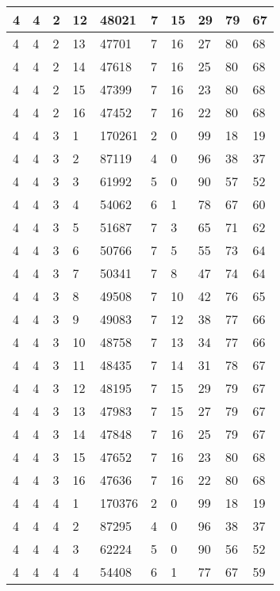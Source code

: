 \begin{table}[!ht]
\begin{tabular}{|l|l|l|l|l|l|l|l|l|l|}
        4 & 4 & 2 & 12 & 48021 & 7 & 15 & 29 & 79 & 67 \\ \hline
        4 & 4 & 2 & 13 & 47701 & 7 & 16 & 27 & 80 & 68 \\ \hline
        4 & 4 & 2 & 14 & 47618 & 7 & 16 & 25 & 80 & 68 \\ \hline
        4 & 4 & 2 & 15 & 47399 & 7 & 16 & 23 & 80 & 68 \\ \hline
        4 & 4 & 2 & 16 & 47452 & 7 & 16 & 22 & 80 & 68 \\ \hline
        4 & 4 & 3 & 1 & 170261 & 2 & 0 & 99 & 18 & 19 \\ \hline
        4 & 4 & 3 & 2 & 87119 & 4 & 0 & 96 & 38 & 37 \\ \hline
        4 & 4 & 3 & 3 & 61992 & 5 & 0 & 90 & 57 & 52 \\ \hline
        4 & 4 & 3 & 4 & 54062 & 6 & 1 & 78 & 67 & 60 \\ \hline
        4 & 4 & 3 & 5 & 51687 & 7 & 3 & 65 & 71 & 62 \\ \hline
        4 & 4 & 3 & 6 & 50766 & 7 & 5 & 55 & 73 & 64 \\ \hline
        4 & 4 & 3 & 7 & 50341 & 7 & 8 & 47 & 74 & 64 \\ \hline
        4 & 4 & 3 & 8 & 49508 & 7 & 10 & 42 & 76 & 65 \\ \hline
        4 & 4 & 3 & 9 & 49083 & 7 & 12 & 38 & 77 & 66 \\ \hline
        4 & 4 & 3 & 10 & 48758 & 7 & 13 & 34 & 77 & 66 \\ \hline
        4 & 4 & 3 & 11 & 48435 & 7 & 14 & 31 & 78 & 67 \\ \hline
        4 & 4 & 3 & 12 & 48195 & 7 & 15 & 29 & 79 & 67 \\ \hline
        4 & 4 & 3 & 13 & 47983 & 7 & 15 & 27 & 79 & 67 \\ \hline
        4 & 4 & 3 & 14 & 47848 & 7 & 16 & 25 & 79 & 67 \\ \hline
        4 & 4 & 3 & 15 & 47652 & 7 & 16 & 23 & 80 & 68 \\ \hline
        4 & 4 & 3 & 16 & 47636 & 7 & 16 & 22 & 80 & 68 \\ \hline
        4 & 4 & 4 & 1 & 170376 & 2 & 0 & 99 & 18 & 19 \\ \hline
        4 & 4 & 4 & 2 & 87295 & 4 & 0 & 96 & 38 & 37 \\ \hline
        4 & 4 & 4 & 3 & 62224 & 5 & 0 & 90 & 56 & 52 \\ \hline
        4 & 4 & 4 & 4 & 54408 & 6 & 1 & 77 & 67 & 59 \\ \hline

\end{tabular}
\end{table}
